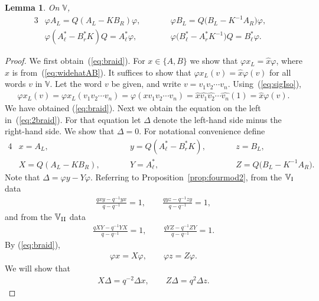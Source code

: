 \documentclass[pdftex]{sigma}
\numberwithin{equation}{section}
\newtheorem{Lemma}[Theorem]{Lemma}
\begin{document}
\begin{Lemma}\label{lem:braid}On $\mathbb V$,
\begin{alignat}{3}
&\varphi A_L = Q(A_L-K B_R) \varphi, \qquad && \varphi B_L = Q\big(B_L-K^{-1} A_R\big) \varphi,& \label{eq:braid}\\
& \varphi (A^*_\ell-B^*_r K)Q = A^*_\ell \varphi, \qquad&& \varphi \big(B^*_\ell-A^*_r K^{-1}\big)Q = B^*_\ell \varphi.& \label{eq:2braid}
\end{alignat}
\end{Lemma}
\begin{proof} We first obtain~(\ref{eq:braid}). For $x \in \lbrace A, B\rbrace$ we show that $\varphi x_L = \widehat x \varphi$, where $\widehat x$ is from~(\ref{eq:widehatAB}). It suffices to show that $\varphi x_L (v) = \widehat x \varphi (v)$ for all words $v$ in $\mathbb V$. Let the word $v$ be given, and write $v=v_1v_2\cdots v_n$. Using~(\ref{eq:sigIso}),
\begin{gather*}
\varphi x_L (v) =\varphi x_L (v_1v_2\cdots v_n)=\varphi (x v_1v_2\cdots v_n)
= \widehat x \widehat{v_1} \widehat{v_2}\cdots \widehat{v_n}(1)= \widehat x \varphi (v).
\end{gather*}
We have obtained (\ref{eq:braid}). Next we obtain the equation on the left in~(\ref{eq:2braid}).
For that equation let $\Delta$ denote the left-hand side minus the right-hand side. We show that $\Delta=0$.
For notational convenience define
\begin{alignat*}{4}
&x = A_L, \qquad && y= Q(A^*_{\ell}-B^*_r K), \qquad && z= B_L,& \\
&X= Q(A_L-KB_R), \qquad && Y=A^*_\ell, \qquad && Z= Q\big(B_L-K^{-1} A_R\big).
\end{alignat*}
Note that $\Delta = \varphi y - Y \varphi$. Referring to Proposition~\ref{prop:fourmod2}, from the $\mathbb V_{\rm I}$ data
\begin{gather*}
\frac{qxy-q^{-1}yx}{q-q^{-1}}=1, \qquad \frac{qyz-q^{-1}zy}{q-q^{-1}}=1,
\end{gather*}
and from the $\mathbb V_{\rm II}$ data
\begin{gather*}
\frac{qXY-q^{-1}YX}{q-q^{-1}}=1, \qquad \frac{qYZ-q^{-1}ZY}{q-q^{-1}}=1.
\end{gather*}
By (\ref{eq:braid}),
\begin{gather*}
\varphi x = X \varphi, \qquad \varphi z = Z \varphi.
\end{gather*}
We will show that
\begin{gather}
X\Delta = q^{-2} \Delta x, \qquad Z\Delta = q^2 \Delta z.

\end{gather}
\end{proof}
\end{document}
